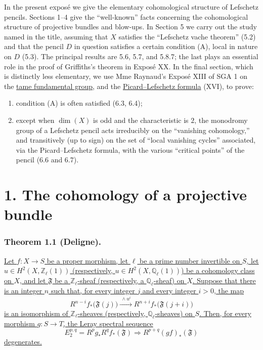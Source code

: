 In the present expos\'e we give the elementary cohomological structure of
Lefschetz pencils. Sections 1--4 give the ``well-known'' facts concerning the
cohomological structure of projective bundles and blow-ups. In Section 5 we
carry out the study named in the title, assuming that $X$ satisfies the
``Lefschetz vache theorem'' (5.2) and that the pencil $D$ in question satisfies
a certain condition (A), local in nature on $D$ (5.3). The principal results
are 5.6, 5.7, and 5.8.7; the last plays an essential role in the proof of
Griffiths's theorem in Expos\'e XX. In the final section, which is distinctly
less elementary, we use Mme Raynaud's Expos\'e XIII of SGA 1 on the
\underline{tame fundamental group}, and the \underline{Picard--Lefschetz
formula} (XVI), to prove:
\begin{enumerate}[label=(\arabic*)]
\item condition (A) is often satisfied (6.3, 6.4);
\item except when $\dim(X)$ is odd and the characteristic is $2$, the
monodromy group of a Lefschetz pencil acts irreducibly on the ``vanishing
cohomology,'' and transitively (up to sign) on the set of ``local vanishing
cycles'' associated, via the Picard--Lefschetz formula, with the various
``critical points'' of the pencil (6.6 and 6.7).
\end{enumerate}

\section*{1. The cohomology of a projective bundle}

\subsubsection*{Theorem 1.1 (Deligne).}
\underline{Let $f:X\longrightarrow S$ be a proper morphism, let $\ell$ be a
prime number invertible on $S$, let
$u\in H^2(X,\mathbb Z_\ell(1))$ (respectively,
$u\in H^2(X,\mathbb Q_\ell(1))$) be a cohomology class on $X$, and let
$\mathfrak F$ be a $\mathbb Z_\ell$-sheaf (respectively, a
$\mathbb Q_\ell$-sheaf) on $X$. Suppose that there is an integer $n$ such
that, for every integer $j$ and every integer $i>0$, the map}
\begin{equation}\tag{1.1.1}
R^{n-i}f_*\bigl(\mathfrak F(j)\bigr)
\xrightarrow{\ \wedge u^i\ }
R^{n+i}f_*\bigl(\mathfrak F(j+i)\bigr)
\end{equation}
\underline{is an isomorphism of $\mathbb Z_\ell$-sheaves (respectively,
$\mathbb Q_\ell$-sheaves) on $S$. Then, for every morphism
$g:S\longrightarrow T$, the Leray spectral sequence}
\[
E_2^{p,q}=R^pg_*R^qf_*(\mathfrak F)
\Longrightarrow R^{p+q}(gf)_*(\mathfrak F)
\]
\underline{degenerates.}

